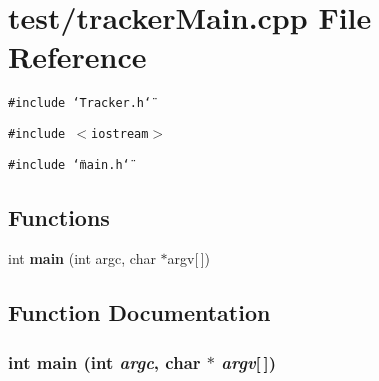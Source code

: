 \section{test/trackerMain.cpp File Reference}
\label{trackerMain_8cpp}
{\tt \#include \char`\"{}Tracker.h\char`\"{}}\par
{\tt \#include $<$iostream$>$}\par
{\tt \#include \char`\"{}main.h\char`\"{}}\par
\subsection*{Functions}
\begin{CompactItemize}
\item 
int {\bf main} (int argc, char $\ast$argv[$\,$])
\end{CompactItemize}


\subsection{Function Documentation}
\subsubsection{\setlength{\rightskip}{0pt plus 5cm}int main (int {\em argc}, char $\ast$ {\em argv}[$\,$])}\label{trackerMain_8cpp_28052c36c3b61c6c0eaa18f5d226118f}


